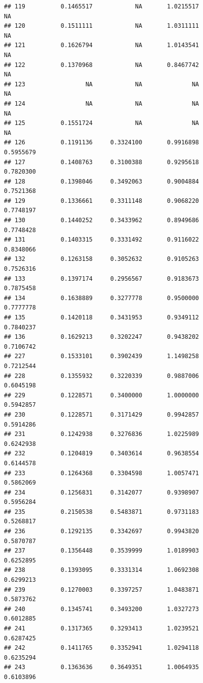\documentclass[]{article}
\begin{document}
\begin{verbatim}
## 119          0.1465517            NA       1.0215517                 NA
## 120          0.1511111            NA       1.0311111                 NA
## 121          0.1626794            NA       1.0143541                 NA
## 122          0.1370968            NA       0.8467742                 NA
## 123                 NA            NA              NA                 NA
## 124                 NA            NA              NA                 NA
## 125          0.1551724            NA              NA                 NA
## 126          0.1191136     0.3324100       0.9916898          0.5955679
## 127          0.1408763     0.3100388       0.9295618          0.7820300
## 128          0.1398046     0.3492063       0.9004884          0.7521368
## 129          0.1336661     0.3311148       0.9068220          0.7748197
## 130          0.1440252     0.3433962       0.8949686          0.7748428
## 131          0.1403315     0.3331492       0.9116022          0.8348066
## 132          0.1263158     0.3052632       0.9105263          0.7526316
## 133          0.1397174     0.2956567       0.9183673          0.7875458
## 134          0.1638889     0.3277778       0.9500000          0.7777778
## 135          0.1420118     0.3431953       0.9349112          0.7840237
## 136          0.1629213     0.3202247       0.9438202          0.7106742
## 227          0.1533101     0.3902439       1.1498258          0.7212544
## 228          0.1355932     0.3220339       0.9887006          0.6045198
## 229          0.1228571     0.3400000       1.0000000          0.5942857
## 230          0.1228571     0.3171429       0.9942857          0.5914286
## 231          0.1242938     0.3276836       1.0225989          0.6242938
## 232          0.1204819     0.3403614       0.9638554          0.6144578
## 233          0.1264368     0.3304598       1.0057471          0.5862069
## 234          0.1256831     0.3142077       0.9398907          0.5956284
## 235          0.2150538     0.5483871       0.9731183          0.5268817
## 236          0.1292135     0.3342697       0.9943820          0.5870787
## 237          0.1356448     0.3539999       1.0189903          0.6252895
## 238          0.1393095     0.3331314       1.0692308          0.6299213
## 239          0.1270003     0.3397257       1.0483871          0.5873762
## 240          0.1345741     0.3493200       1.0327273          0.6012885
## 241          0.1317365     0.3293413       1.0239521          0.6287425
## 242          0.1411765     0.3352941       1.0294118          0.6235294
## 243          0.1363636     0.3649351       1.0064935          0.6103896

\end{verbatim}
\end{document}
